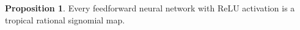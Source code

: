 \documentclass{article}
\theoremstyle{definition}
\newtheorem{proposition}[theorem]{Proposition}
\newtheorem{comment}[theorem]{Comment}
\begin{document}

\begin{proposition}
Every feedforward neural network with ReLU activation is a tropical rational signomial map.
\end{proposition}
\newpage



\end{document}
